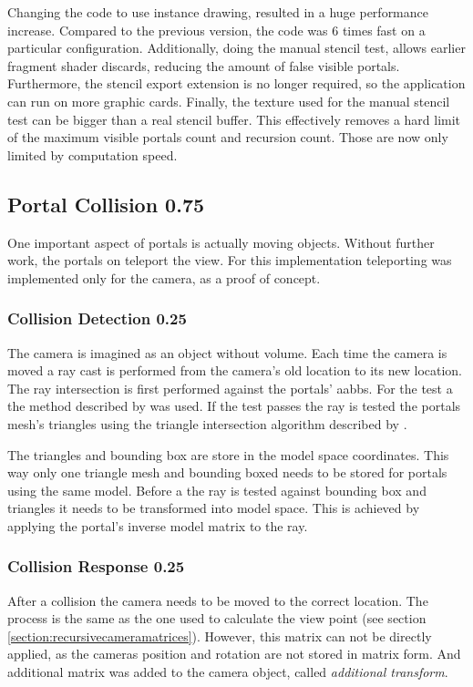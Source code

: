 Changing the code to use instance drawing, resulted in a huge performance increase. Compared to the previous version, the code was 6 times fast on a particular configuration. Additionally, doing the manual stencil test, allows earlier fragment shader discards, reducing the amount of false visible portals. Furthermore, the stencil export extension is no longer required, so the application can run on more graphic cards. Finally, the texture used for the manual stencil test can be bigger than a real stencil buffer. This effectively removes a hard limit of the maximum visible portals count and recursion count. Those are now only limited by computation speed.


\subsection{Portal Collision 0.75}
One important aspect of portals is actually moving objects. Without further work, the portals on teleport the view. For this implementation teleporting was implemented only for the camera, as a proof of concept.

\subsubsection{Collision Detection 0.25}
The camera is imagined as an object without volume. Each time the camera is moved a ray cast is performed from the camera's old location to its new location. The ray intersection is first performed against the portals' \glspl{aabb}. For the test a the method described by \textcite{williams:2005:efficient} was used. If the test passes the ray is tested the portals mesh's triangles using the triangle intersection algorithm described by \textcite{moller:2005:fast}.


The triangles and bounding box are store in the model space coordinates. This way only one triangle mesh and bounding boxed needs to be stored for portals using the same model. Before a the ray is tested against bounding box and triangles it needs to be transformed into model space. This is achieved by applying the portal's inverse model matrix to the ray.

\subsubsection{Collision Response 0.25}

After a collision the camera needs to be moved to the correct location. The process is the same as the one used to calculate the view point (see section \ref{section:recursivecameramatrices}). However, this matrix can not be directly applied, as the cameras position and rotation are not stored in matrix form.
And additional matrix was added to the camera object, called \textit{additional transform}.

